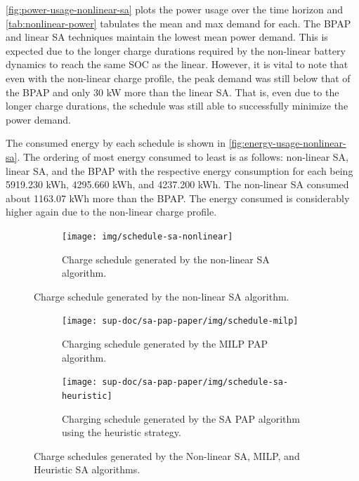 \documentclass[ee,thesis]{usuthesis}
\begin{document}
\ref{fig:power-usage-nonlinear-sa} plots the power usage over the time horizon and \ref{tab:nonlinear-power} tabulates
the mean and max demand for each. The BPAP and linear SA techniques maintain the lowest mean power demand. This is
expected due to the longer charge durations required by the non-linear battery dynamics to reach the same SOC as the
linear. However, it is vital to note that even with the non-linear charge profile, the peak demand was still below that
of the BPAP and only 30 kW more than the linear SA. That is, even due to the longer charge durations, the schedule was
still able to successfully minimize the power demand.

The consumed energy by each schedule is shown in \ref{fig:energy-usage-nonlinear-sa}. The ordering of most energy
consumed to least is as follows: non-linear SA, linear SA, and the BPAP with the respective energy consumption for each
being \num{5919.230} kWh, \num{4295.660} kWh, and \num{4237.200} kWh. The non-linear SA consumed about \num{1163.07} kWh
more than the BPAP. The energy consumed is considerably higher again due to the non-linear charge profile.

\begin{figure}
  \centering
  \begin{subfigure}[t]{\textwidth}
    \centering
    \texttt{[image: img/schedule-sa-nonlinear]}
    \caption{Charge schedule generated by the non-linear SA algorithm.}
    \label{subfig:schedule-nonlinear-sa}
  \end{subfigure}
  \hfill

\end{figure}

\begin{figure} \ContinuedFloat
  \centering
  \begin{subfigure}[t]{\textwidth}
    \centering
    \texttt{[image: sup-doc/sa-pap-paper/img/schedule-milp]}
    \caption{Charging schedule generated by the MILP PAP algorithm.}
    \label{subfig:schedule-milp}
  \end{subfigure}

  \begin{subfigure}[t]{\textwidth}
    \centering \texttt{[image: sup-doc/sa-pap-paper/img/schedule-sa-heuristic]}
    \caption{Charging schedule generated by the SA PAP algorithm using the heuristic strategy.}
    \label{subfig:schedule-heuristic-sa}
  \end{subfigure}
  \caption{Charge schedules generated by the Non-linear SA, MILP, and Heuristic SA algorithms.}
  \label{fig:nonlinear-schedule}
\end{figure}
\end{document}
